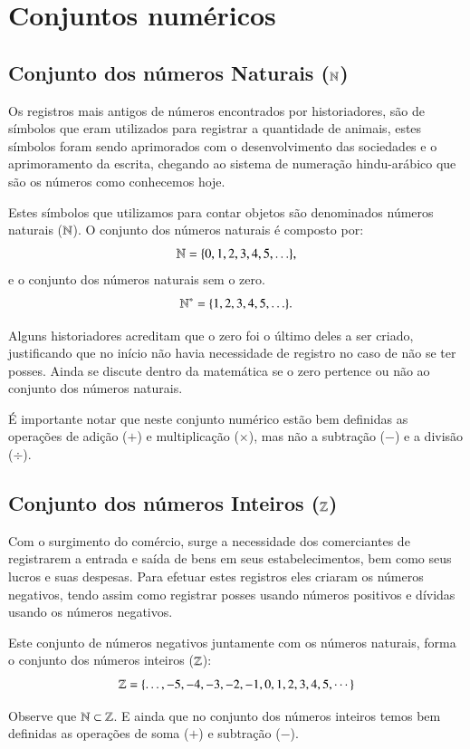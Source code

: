 \chapter{Conjuntos numéricos}

\section{Conjunto dos números Naturais (\texorpdfstring{$\mathbb{N}$}{N})}

Os registros mais antigos de números encontrados por historiadores, são de símbolos que eram utilizados para registrar a quantidade de animais, estes símbolos foram sendo aprimorados com o desenvolvimento das sociedades e o aprimoramento da escrita, chegando ao sistema de numeração hindu-arábico que são os números como conhecemos hoje.

Estes símbolos que utilizamos para contar objetos são denominados números naturais ($\mathbb{N}$). O conjunto dos números naturais é composto por:
\[\mathbb{N}= \{0, 1, 2, 3, 4, 5, \ldots \},\]
e o conjunto dos números naturais sem o zero.
\[\mathbb{N}^{*}= \{1, 2, 3, 4, 5, \ldots \}.\]

Alguns historiadores acreditam que o zero foi o último deles a ser criado, justificando que no início não havia necessidade de registro no caso de não se ter posses. Ainda se discute dentro da matemática se o zero pertence ou não ao conjunto dos números naturais.

É importante notar que neste conjunto numérico estão bem definidas as operações de adição ($+$) e multiplicação ($\times$), mas não a subtração ($-$) e a divisão ($\div$).

\section{Conjunto dos números Inteiros (\texorpdfstring{$\mathbb{Z}$}{Z})}

Com o surgimento do comércio, surge a necessidade dos comerciantes de registrarem a entrada e saída de bens em seus estabelecimentos, bem como seus lucros e suas despesas. Para efetuar estes registros eles criaram os números negativos, tendo assim como registrar posses usando números positivos e dívidas usando os números negativos.

Este conjunto de números negativos juntamente com os números naturais, forma o conjunto dos números inteiros ($\mathbb{Z}$):
\[\mathbb{Z}= \{ \ldots , -5, -4, -3, -2, -1, 0, 1, 2, 3, 4, 5, \cdots \}\]

Observe que $\mathbb{N} \subset \mathbb{Z}$. E ainda que no conjunto dos números inteiros temos bem definidas as operações de soma ($+$) e subtração ($-$).

